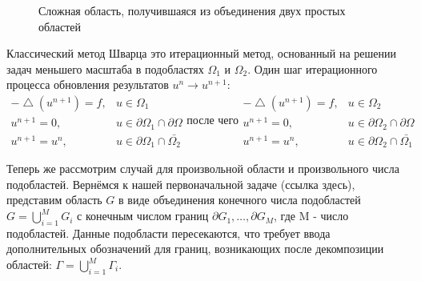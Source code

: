 \documentclass[a4paper]{article}
\begin{document}
\begin{figure}[h]
\caption{Сложная область, получившаяся из объединения двух простых областей}
\label{fig:image_01}
\end{figure}

\newpage

Классический метод Шварца это итерационный метод, основанный на решении задач меньшего масштаба в подобластях $\Omega_1$ и $\Omega_2$. Один шаг итерационного процесса обновления результатов $u^n \rightarrow u^{n+1}$:
\begin{equation*}
\begin{array}{rl}
-\bigtriangleup \! (u^{n+1}) = f, & u \in \Omega_1 \\
u^{n+1} = 0, & u \in \partial \Omega_1 \cap \partial \Omega \\
u^{n+1} = u^n, & u \in \partial \Omega_1 \cap \bar{\Omega_2}
\end{array}
\textrm{после чего}
\begin{array}{rl}
-\bigtriangleup \! (u^{n+1}) = f, & u \in \Omega_2 \\
u^{n+1} = 0, & u \in \partial \Omega_2 \cap \partial \Omega \\
u^{n+1} = u^n, & u \in \partial \Omega_2 \cap \bar{\Omega_1}
\end{array}
\end{equation*}

Теперь же рассмотрим случай для произвольной области и произвольного числа подобластей. Вернёмся к нашей первоначальной задаче (ссылка здесь), представим область $G$ в виде объединения конечного числа подобластей $G = \bigcup_{i=1}^{M} G_i$ с конечным числом границ $\partial G_1, \ldots, \partial G_M$, где M - число подобластей. Данные подобласти пересекаются, что требует ввода дополнительных обозначений для границ, возникающих после декомпозиции областей: $\Gamma = \bigcup_{i=1}^{M} \Gamma_i$. 
\end{document}
